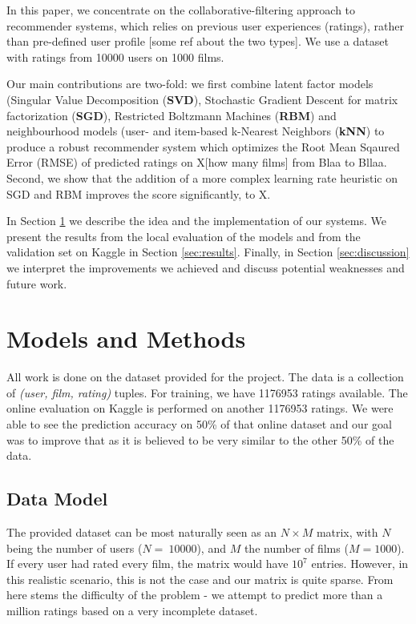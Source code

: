 \documentclass[10pt,conference,compsocconf]{IEEEtran}
\begin{document}
In this paper, we concentrate on the collaborative-filtering approach to recommender systems, which relies on previous user experiences (ratings), rather than pre-defined user profile [some ref about the two types]. We use a dataset with ratings from 10000 users on 1000 films.

Our main contributions are two-fold: we first combine latent factor models (Singular Value Decomposition (\textbf{SVD}), Stochastic Gradient Descent for matrix factorization (\textbf{SGD}), Restricted Boltzmann Machines (\textbf{RBM}) and neighbourhood models (user- and item-based k-Nearest Neighbors (\textbf{kNN}) to produce a robust recommender system which optimizes the Root Mean Sqaured Error (RMSE) of predicted ratings on X[how many films] from Blaa to Bllaa. Second, we show that the addition of a more complex learning rate heuristic on SGD and RBM improves the score significantly, to X. 

In Section \ref{sec:models} we describe the idea and the implementation of our systems. We present the results from the local evaluation of the models and from the validation set on Kaggle in Section \ref{sec:results}. Finally, in Section \ref{sec:discussion} we interpret the improvements we achieved and discuss potential weaknesses and future work.



\section{Models and Methods}
\label{sec:models}
All work is done on the dataset provided for the project. The data is a collection of \textit{(user, film, rating)} tuples. For training, we have 1176953 ratings available. The online evaluation on Kaggle is performed on another 1176953 ratings. We were able to see the prediction accuracy on 50\% of that online dataset and our goal was to improve that as it is believed to be very similar to the other 50\% of the data.
\subsection{Data Model}

The provided dataset can be most naturally seen as an $N\times M$ matrix, with $N$ being the number of users ($N=~10000$), and $M$ the number of films ($M=1000$). If every user had rated every film, the matrix would have $10^7$ entries. However, in this realistic scenario, this is not the case and our matrix is quite sparse. From here stems the difficulty of the problem - we attempt to predict more than a million ratings based on a very incomplete dataset. 
\end{document}
